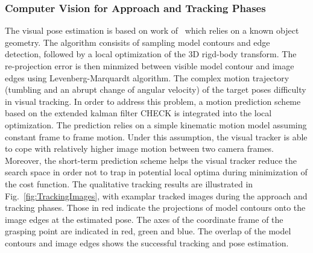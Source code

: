 \subsubsection{Computer Vision for Approach and Tracking Phases}
%
%
The visual pose estimation is based on work of~\cite{Drummond2002} which relies on a known object geometry. The algorithm consisits of sampling model contours and edge detection, followed by a local optimization of the 3D rigd-body transform. The re-projection error is then minmized between visible model contour and image edges using Levenberg-Marquardt algorithm.
The complex motion trajectory (tumbling and an abrupt change of angular velocity) of the target poses difficulty in visual tracking. In order to address this problem, a motion prediction scheme based on the extended kalman filter CHECK is integrated into the local optimization. The prediction relies on a simple kinematic motion model assuming constant frame to frame motion. Under this assumption, the visual tracker is able to cope with relatively higher image motion between two camera frames. Moreover, the short-term prediction scheme helps the visual tracker reduce the search space in order not to trap in potential local optima during minimization of the cost function. The qualitative tracking results are illustrated in Fig.~\ref{fig:TrackingImages}, with examplar tracked images during the approach and tracking phases. Those in red indicate the projections of model contours onto the image edges at the estimated pose. The axes of the coordinate frame of the grasping point are indicated in red, green and blue. The overlap of the model contours and image edges shows the successful tracking and pose estimation.
%
